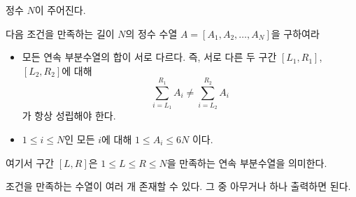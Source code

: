 정수 $N$이 주어진다.


다음 조건을 만족하는 길이 $N$의 정수 수열 $A = [A_1, A_2, \dots, A_N]$을 구하여라

\begin{itemize}
    \item 모든 연속 부분수열의 합이 서로 다르다.  
    즉, 서로 다른 두 구간 $[L_1, R_1]$, $[L_2, R_2]$에 대해
    $$
    \sum_{i=L_1}^{R_1} A_i \ne \sum_{i=L_2}^{R_2} A_i
    $$
    가 항상 성립해야 한다.
    \item $1 \le i \le N$인 모든 $i$에 대해 $1 \le A_i \le 6N$ 이다.
\end{itemize}

여기서 구간 $[L, R]$은 $1 \le L \le R \le N$을 만족하는 연속 부분수열을 의미한다.

조건을 만족하는 수열이 여러 개 존재할 수 있다. 그 중 아무거나 하나 출력하면 된다.